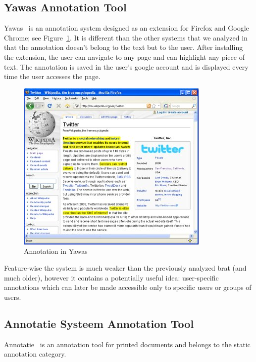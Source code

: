 \subsection{Yawas Annotation Tool} 
Yawas~\cite{yawas:on} is an annotation system designed as an extension for Firefox and
Google Chrome; see Figure~\ref{fig:yawas}. It is different than the other systems that we
analyzed in that the annotation doesn't belong to the text but to the user. After
installing the extension, the user can navigate to any page and can highlight any piece of
text. The annotation is saved in the user's google account and is displayed every time the
user accesses the page.

\begin{figure}[ht]\centering
  \includegraphics[width=.6\textwidth]{../PIC/yawas}
  \caption{Annotation in Yawas}\label{fig:yawas}
\end{figure}

Feature-wise the system is much weaker than the previously analyzed brat (and much older),
however it contains a potentially useful idea: user-specific annotations which can later
be made accessible only to specific users or groups of users.

\subsection{Annotatie Systeem Annotation Tool} %
Annotatie~\cite{annotatie:on} is an annotation tool for printed
documents and belongs to the static annotation category.\vspace{10pt}

